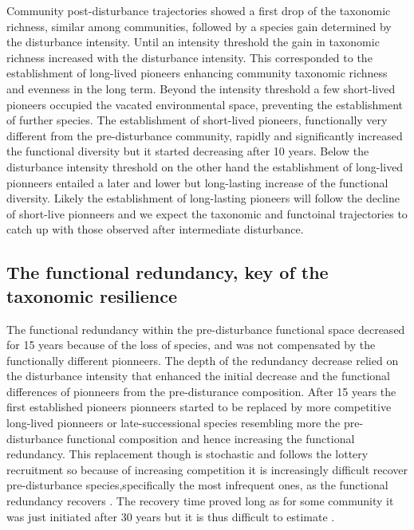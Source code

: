 \documentclass[fleqn,10pt]{ArtEcoFoG} %
\begin{document}
Community post-disturbance trajectories showed a first drop of the
taxonomic richness, similar among communities, followed by a species
gain determined by the disturbance intensity. Until an intensity
threshold the gain in taxonomic richness increased with the disturbance
intensity. This corresponded to the establishment of long-lived pioneers
enhancing community taxonomic richness and evenness in the long term.
Beyond the intensity threshold a few short-lived pioneers occupied the
vacated environmental space, preventing the establishment of further
species. The establishment of short-lived pioneers, functionally very
different from the pre-disturbance community, rapidly and significantly
increased the functional diversity but it started decreasing after 10
years. Below the disturbance intensity threshold on the other hand the
establishment of long-lived pionneers entailed a later and lower but
long-lasting increase of the functional diversity. Likely the
establishment of long-lasting pioneers will follow the decline of
short-live pionneers and we expect the taxonomic and functoinal
trajectories to catch up with those observed after intermediate
disturbance.

\subsection{The functional redundancy, key of the taxonomic
resilience}\label{the-functional-redundancy-key-of-the-taxonomic-resilience}

The functional redundancy within the pre-disturbance functional space
decreased for 15 years because of the loss of species, and was not
compensated by the functionally different pionneers. The depth of the
redundancy decrease relied on the disturbance intensity that enhanced
the initial decrease and the functional differences of pionneers from
the pre-disturance composition. After 15 years the first established
pioneers pionneers started to be replaced by more competitive long-lived
pionneers or late-successional species resembling more the
pre-disturbance functional composition and hence increasing the
functional redundancy. This replacement though is stochastic and follows
the lottery recruitment so because of increasing competition it is
increasingly difficult recover pre-disturbance species,specifically the
most infrequent ones, as the functional redundancy recovers
\citep{Busing2002}. The recovery time proved long as for some community
it was just initiated after 30 years but it is thus difficult to
estimate \citep{Trenbath1999, Elmqvist2003, Diaz2005}.
\end{document}
